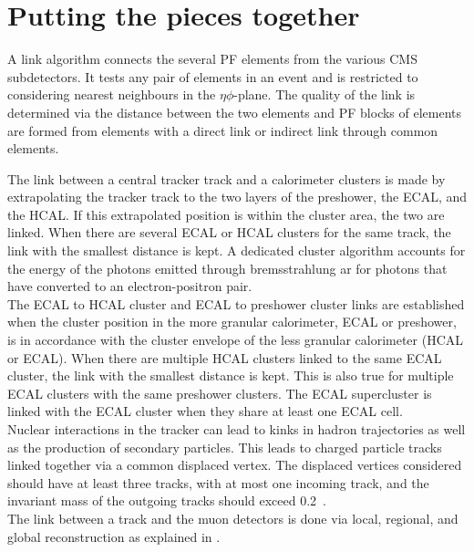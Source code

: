\section{Putting the pieces together}
\label{sec:id}
A link algorithm connects the several PF elements from the various CMS subdetectors. It tests any pair of elements in an event and is restricted to considering nearest neighbours in the $\eta\phi$-plane. The quality of the link is determined via the distance between the two elements and PF blocks of elements are formed from elements with a direct link or indirect link through common elements. 


The link between a central tracker track and a calorimeter clusters is made by extrapolating the tracker track to the two layers of the preshower, the ECAL, and the HCAL. If this extrapolated position is within the cluster area, the two are linked. When there are several ECAL or HCAL clusters for the same track, the link with the smallest distance is kept. A dedicated cluster algorithm accounts for the energy of the photons emitted through bremsstrahlung ar for photons that have converted to an electron-positron pair. \\The ECAL to HCAL cluster and ECAL to preshower cluster links are established when the cluster position in the more granular calorimeter, ECAL or preshower, is in accordance with the cluster envelope of the less granular calorimeter (HCAL or ECAL).  When there are multiple HCAL clusters linked to the same ECAL cluster, the link with the smallest distance is kept. This is also true for multiple ECAL clusters with the same preshower clusters. The ECAL supercluster is linked with the ECAL cluster when they share at least one ECAL cell. \\
Nuclear interactions in the tracker can lead to kinks in hadron trajectories as well as the production of secondary particles. This leads to charged particle tracks linked together via a common displaced vertex. The displaced vertices considered should have at least three tracks, with at most one incoming track, and the invariant mass of the outgoing tracks should exceed 0.2~\GeV. \\
The link between a track and the muon detectors is done via local, regional, and global reconstruction as explained in . 


